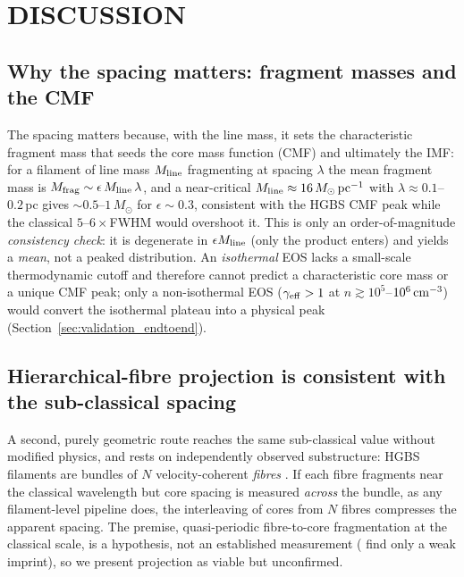 \documentclass[usenatbib,twoside,twocolumn]{mnras}
\begin{document}
\section{DISCUSSION}
\label{sec:discussion}

\subsection{Why the spacing matters: fragment masses and the CMF}
\label{sec:cmf}
The spacing matters because, with the line mass, it sets the characteristic fragment mass that seeds the core mass function (CMF) and ultimately the IMF: for a filament of line mass $M_{\rm line}$ fragmenting at spacing $\lambda$ the mean fragment mass is $M_{\rm frag}\sim\epsilon\,M_{\rm line}\,\lambda$, and a near-critical $M_{\rm line}\approx16\,M_\odot\,{\rm pc^{-1}}$ with $\lambda\approx0.1$--$0.2$\,pc gives $\sim0.5$--$1\,M_\odot$ for $\epsilon\sim0.3$, consistent with the HGBS CMF peak while the classical $5$--$6\times$FWHM would overshoot it. This is only an order-of-magnitude \emph{consistency check}: it is degenerate in $\epsilon M_{\rm line}$ (only the product enters) and yields a \emph{mean}, not a peaked distribution. An \emph{isothermal} EOS lacks a small-scale thermodynamic cutoff and therefore cannot predict a characteristic core mass or a unique CMF peak; only a non-isothermal EOS ($\gamma_{\rm eff}>1$ at $n\gtrsim10^{5}$--$10^{6}\,{\rm cm^{-3}}$) would convert the isothermal plateau into a physical peak (Section~\ref{sec:validation_endtoend}).

\subsection{Hierarchical-fibre projection is consistent with the sub-classical spacing}
\label{sec:fibre_projection}

A second, purely geometric route reaches the same sub-classical value without modified physics, and rests on independently observed substructure: HGBS filaments are bundles of $N$ velocity-coherent \emph{fibres} \citep{Hacar2013,Hacar2018,Yang2024}. If each fibre fragments near the classical wavelength but core spacing is measured \emph{across} the bundle, as any filament-level pipeline does, the interleaving of cores from $N$ fibres compresses the apparent spacing. The premise, quasi-periodic fibre-to-core fragmentation at the classical scale, is a hypothesis, not an established measurement (\citealt{Yang2024} find only a weak imprint), so we present projection as viable but unconfirmed.
\end{document}
